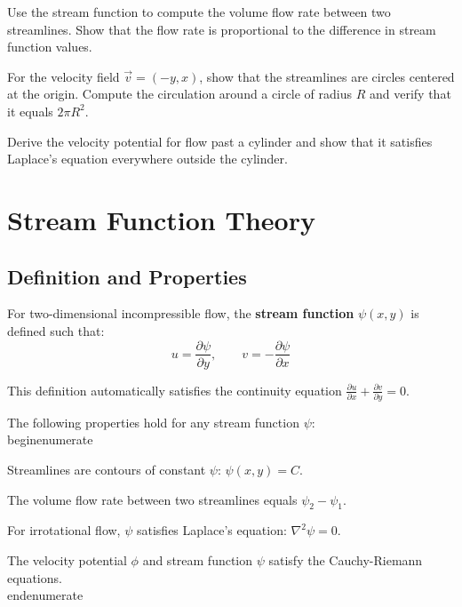 \begin{exercise}
Use the stream function to compute the volume flow rate between two streamlines.
Show that the flow rate is proportional to the difference in stream function values.
\end{exercise}

\begin{exercise}
For the velocity field $\vec{v} = (-y, x)$, show that the streamlines are circles centered at the origin.
Compute the circulation around a circle of radius $R$ and verify that it equals $2\pi R^2$.
\end{exercise}

\begin{exercise}
Derive the velocity potential for flow past a cylinder and show that it satisfies Laplace's equation everywhere outside the cylinder.
\end{exercise}

\section{Stream Function Theory}

\subsection{Definition and Properties}

For two-dimensional incompressible flow, the \textbf{stream function} $\psi(x,y)$ is defined such that:
\[
u = \frac{\partial \psi}{\partial y}, \qquad v = -\frac{\partial \psi}{\partial x}
\]

This definition automatically satisfies the continuity equation $\frac{\partial u}{\partial x} + \frac{\partial v}{\partial y} = 0$.

\begin{theorem}
The following properties hold for any stream function $\psi$:
\\begin{enumerate}
    \item Streamlines are contours of constant $\psi$: $\psi(x,y) = C$.
    \item The volume flow rate between two streamlines equals $\psi_2 - \psi_1$.
    \item For irrotational flow, $\psi$ satisfies Laplace's equation: $\nabla^2 \psi = 0$.
    \item The velocity potential $\phi$ and stream function $\psi$ satisfy the Cauchy-Riemann equations.
\\end{enumerate}
\end{theorem}


